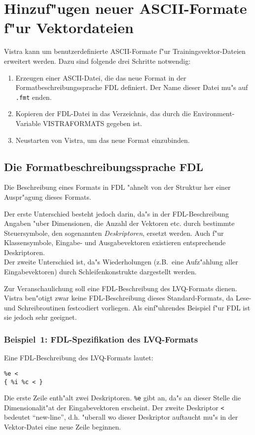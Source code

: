 \section{Hinzuf"ugen neuer ASCII-Formate f"ur Vektordateien}
\label{fdl}

Vistra kann um benutzerdefinierte ASCII-Formate f"ur 
Trainingsvektor-Dateien erweitert werden.
Dazu sind folgende drei Schritte notwendig:

\begin{enumerate}
\item Erzeugen einer ASCII-Datei, die das neue Format in der 
Formatbeschreibungssprache FDL definiert.
Der Name dieser Datei mu"s auf {\tt .fmt} enden.
\item Kopieren der FDL-Datei in das Verzeichnis, das durch die 
Environment-Variable VISTRAFORMATS gegeben ist.
\item Neustarten von Vistra, um das neue Format einzubinden.
\end{enumerate}

\subsection{Die Formatbeschreibungssprache FDL}

Die Beschreibung eines Formats in FDL "ahnelt von der Struktur her 
einer Auspr"agung dieses Formats.

Der erste Unterschied besteht jedoch darin, da"s in der FDL-Beschreibung Angaben
"uber Dimensionen, die Anzahl der Vektoren etc. durch bestimmte
Steuersymbole, den sogenannten {\it Deskriptoren}, ersetzt werden.
Auch f"ur Klassensymbole, Eingabe- und Ausgabevektoren existieren
entsprechende Deskriptoren. \\ 
Der zweite Unterschied ist, da"s Wiederholungen (z.B.~eine Aufz"ahlung
aller Eingabevektoren) durch Schleifenkonstrukte dargestellt werden.

Zur Veranschaulichung soll eine FDL-Beschreibung des LVQ-Formats dienen.
Vistra be\-n"o\-tigt zwar keine FDL-Beschreibung dieses Standard-Formats, da
Lese- und Schreibroutinen festcodiert vorliegen.
Als einf"uhrendes Beispiel f"ur FDL ist sie jedoch sehr geeignet.   

\subsubsection*{Beispiel~1: FDL-Spezifikation des LVQ-Formats}
\begin{samepage} Eine FDL-Beschreibung des LVQ-Formats lautet:
\begin{verbatim}
%e <
{ %i %c < }
\end{verbatim}  
\end{samepage}
Die erste Zeile enth"alt zwei Deskriptoren.
{\tt \%e} gibt an, da"s an dieser Stelle die Dimensionalit"at der 
Eingabevektoren erscheint.
Der zweite Deskriptor {\tt <} bedeutet "`new-line"', d.h. "uberall wo
dieser Deskriptor auftaucht mu"s in der Vektor-Datei eine neue Zeile
beginnen.

